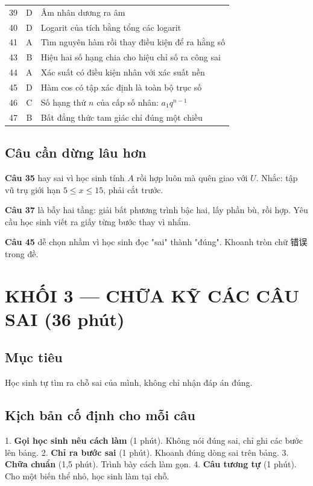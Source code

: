 \documentclass[11pt, a4paper]{article}
\begin{document}
{\begin{tabularx}{\linewidth}{@{\hspace{6pt}}lcX@{\hspace{6pt}}}
39 & D & Âm nhân dương ra âm \\
40 & D & Logarit của tích bằng tổng các logarit \\
41 & A & Tìm nguyên hàm rồi thay điều kiện để ra hằng số \\
43 & B & Hiệu hai số hạng chia cho hiệu chỉ số ra công sai \\
44 & A & Xác suất có điều kiện nhân với xác suất nền \\
45 & D & Hàm cos có tập xác định là toàn bộ trục số \\
46 & C & Số hạng thứ $n$ của cấp số nhân: $a_1 q^{n-1}$ \\
47 & B & Bất đẳng thức tam giác chỉ đúng một chiều \\
\bottomrule
\end{tabularx}}

\subsection{Câu cần dừng lâu hơn}

\textbf{Câu 35} hay sai vì học sinh tính $A$ rồi hợp luôn mà quên giao với $U$. Nhắc: tập vũ trụ giới hạn $5 \le x \le 15$, phải cắt trước.

\textbf{Câu 37} là bẫy hai tầng: giải bất phương trình bậc hai, lấy phần bù, rồi hợp. Yêu cầu học sinh viết ra giấy từng bước thay vì nhẩm.

\textbf{Câu 45} dễ chọn nhầm vì học sinh đọc "sai" thành "đúng". Khoanh tròn chữ 错误 trong đề.

\section{KHỐI 3 — CHỮA KỸ CÁC CÂU SAI (36 phút)}

\subsection{Mục tiêu}

Học sinh tự tìm ra chỗ sai của mình, không chỉ nhận đáp án đúng.

\subsection{Kịch bản cố định cho mỗi câu}

1. \textbf{Gọi học sinh nêu cách làm} (1 phút). Không nói đúng sai, chỉ ghi các bước lên bảng.
2. \textbf{Chỉ ra bước sai} (1 phút). Khoanh đúng dòng sai trên bảng.
3. \textbf{Chữa chuẩn} (1,5 phút). Trình bày cách làm gọn.
4. \textbf{Câu tương tự} (1 phút). Cho một biến thể nhỏ, học sinh làm tại chỗ.
\end{document}
